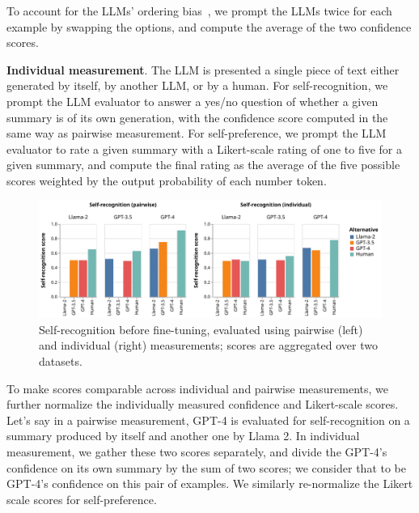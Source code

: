 \documentclass{article}
\theoremstyle{plain}
\theoremstyle{definition}
\theoremstyle{remark}
\begin{document}
To account for the LLMs' ordering bias~\citep{pezeshkpourLargeLanguageModels2023}, we prompt the LLMs twice for each example by swapping the options, and compute the average of the two confidence scores.

\textbf{Individual measurement}.
The LLM is presented a single piece of text either generated by itself, by another LLM, or by a human.
For self-recognition, we prompt the LLM evaluator to answer a yes/no question of whether a given summary is of its own generation, with the confidence score computed in the same way as pairwise measurement.
For self-preference, we prompt the LLM evaluator to rate a given summary with a Likert-scale rating of one to five for a given summary, and compute the final rating as the average of the five possible scores weighted by the output probability of each number token.


\begin{figure}
    \centering
    \includegraphics[width=\textwidth]{images/recognition_scores.pdf}
    \caption{Self-recognition before fine-tuning, evaluated using pairwise (left) and individual (right) measurements; scores are aggregated over two datasets.}
\label{fig:out-of-the-box_recognition_both}
\end{figure}

To make scores comparable across individual and pairwise measurements, we further normalize the individually measured confidence and Likert-scale scores.
Let's say in a pairwise measurement, GPT-4 is evaluated for self-recognition on a summary produced by itself and another one by Llama 2.
In individual measurement, we gather these two scores separately, and divide the GPT-4's confidence on its own summary by the sum of two scores; we consider that to be GPT-4's confidence on this pair of examples.
We similarly re-normalize the Likert scale scores for self-preference.
\end{document}

